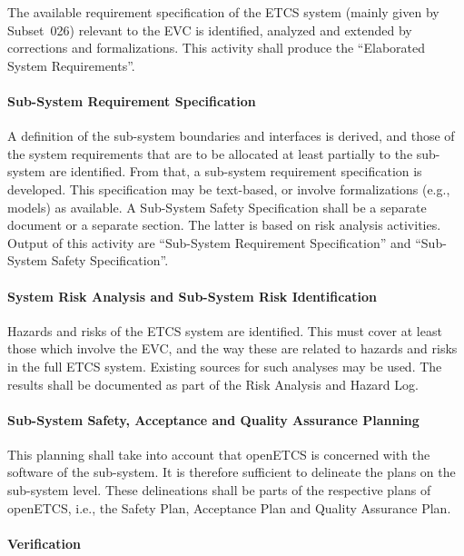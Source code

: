 \documentclass{template/openetcs_article}
\begin{document}
The available requirement specification of the ETCS system (mainly
given by Subset~026) relevant to the EVC is identified, analyzed and
extended by corrections and formalizations. This activity shall
produce the ``Elaborated System Requirements''.

\paragraph{Sub-System Requirement Specification}
\label{sec:1-a-2}

A definition of the sub-system boundaries and interfaces is derived,
and those of the system requirements that are to be allocated at least
partially to the sub-system are identified. From that, a sub-system
requirement specification is developed. This specification may be
text-based, or involve formalizations (e.g., models) as available. A
Sub-System Safety Specification shall be a separate document or a
separate section. The latter is based on risk analysis
activities. Output of this activity are ``Sub-System Requirement
Specification'' and ``Sub-System Safety Specification''. 

\paragraph{System Risk Analysis and Sub-System Risk Identification}
\label{sec:1-a-3}

Hazards and risks of the ETCS system are identified. This must cover
at least those which involve the EVC, and the way these are related to
hazards and risks in the full ETCS system. Existing sources for such
analyses may be used. The results shall be documented as part of the
Risk Analysis and Hazard Log.

\paragraph{Sub-System Safety, Acceptance and Quality Assurance Planning}
\label{sec:1-a-4}

This planning shall take into account that openETCS is concerned with
the software of the sub-system. It is therefore sufficient to
delineate the plans on the sub-system level. These delineations shall
be parts of the respective plans of openETCS, i.e., the Safety Plan,
Acceptance Plan and Quality Assurance Plan.

\paragraph{Verification}
\end{document}

